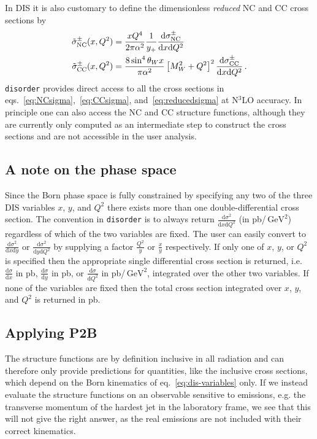 \documentclass[submission, PhysCodeb]{SciPost}
\newcommand{\disorder}{{\tt disorder}}
\newcommand{\dd}{\mathrm{d}}
\newcommand{\NC}{\mathrm{NC}}
\newcommand{\CC}{\mathrm{CC}}
\newcommand{\GEV}{\,\mathrm{GeV}}
\newcommand{\NNNLO}{N$^3$LO}
\begin{document}
In DIS it is also customary to define the dimensionless
\emph{reduced} NC and CC cross sections by~\cite{H1:2012qti}
\begin{align}
  \label{eq:reducedsigma}
  \tilde{\sigma}_\NC^\pm(x,Q^2) &= \frac{xQ^4}{2\pi\alpha^2}\frac{1}{y_+}\frac{\dd\sigma_{\NC}^\pm}{\dd x \dd Q^2} \\ \notag
  \tilde{\sigma}_\CC^\pm(x,Q^2) &= \frac{8\sin^4\theta_W x}{\pi\alpha^2}\left[M_W^2+Q^2\right]^2\frac{\dd\sigma_{\CC}^\pm}{\dd x \dd Q^2}\,.
\end{align}
\disorder{} provides direct access to all the cross sections in
eqs.~\eqref{eq:NCsigma},~\eqref{eq:CCsigma},
and~\eqref{eq:reducedsigma} at \NNNLO{} accuracy. In principle one can
also access the NC and CC structure functions, although they are
currently only computed as an intermediate step to construct the cross
sections and are not accessible in the user analysis.

\subsection{A note on the phase space}
\label{sec:phasespace}
Since the Born phase space is fully constrained by specifying any two
of the three DIS variables $x$, $y$, and $Q^2$ there exists more than
one double-differential cross section. The convention in \disorder{}
is to always return $\frac{\dd\sigma^2}{\dd x \dd Q^2}$ (in
pb/$\GEV^2$) regardless of which of the two variables are fixed. The
user can easily convert to $\frac{\dd\sigma^2}{\dd x \dd y}$ or
$\frac{\dd\sigma^2}{\dd y \dd Q^2}$ by supplying a factor
$\frac{Q^2}{y}$ or $\frac{x}{y}$ respectively. If only one of $x$,
$y$, or $Q^2$ is specified then the appropriate single differential
cross section is returned, i.e.~$\frac{\dd\sigma}{\dd x}$ in pb,
$\frac{\dd\sigma}{\dd y}$ in pb, or $\frac{\dd\sigma}{\dd Q^2}$ in
pb/$\GEV^2$, integrated over the other two variables. If none of the
variables are fixed then the total cross section integrated over $x$,
$y$, and $Q^2$ is returned in pb.

\subsection{Applying P2B}
\label{sec:P2B}
The structure functions are by definition inclusive in all radiation
and can therefore only provide predictions for quantities, like the
inclusive cross sections, which depend on the Born kinematics of
eq.~\eqref{eq:dis-variables} only. If we instead evaluate the
structure functions on an observable sensitive to emissions, e.g. the
transverse momentum of the hardest jet in the laboratory frame, we see that
this will not give the right answer, as the real emissions are not
included with their correct kinematics. 
\end{document}
